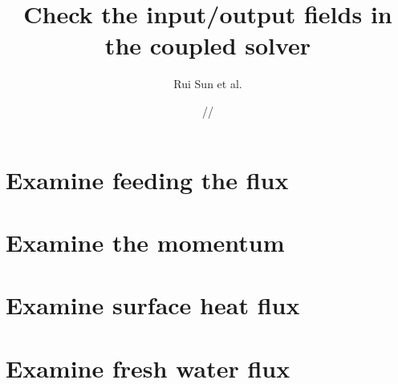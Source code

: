 \documentclass[11pt]{report}
\title{\textbf{Check the input/output fields in the coupled solver}}
\author{Rui Sun et al.}
\date{\oldstylenums{07}/\oldstylenums{01}/\oldstylenums{2018}}
\begin{document}
\maketitle

\section{Examine feeding the flux}

 
\section{Examine the momentum}



\section{Examine surface heat flux}








\section{Examine fresh water flux}


\end{document}
